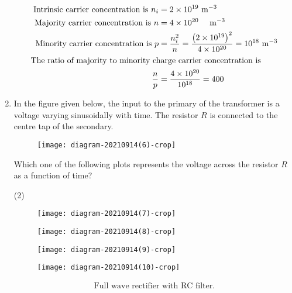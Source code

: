 \begin{enumerate}
	{	}
	\begin{answer}
		\begin{align*}
		\text{	Intrinsic carrier concentration is }n_{i}&=2 \times 10^{19} \mathrm{~m}^{-3}\\
		\text{Majority carrier concentration is }n&=4 \times 10^{20} \quad \mathrm{~m}^{-3}\\
		\text{Minority carrier concentration is }p&=\frac{n_{i}^{2}}{n}=\frac{\left(2 \times 10^{19}\right)^{2}}{4 \times 10^{20}}=10^{18} \mathrm{~m}^{-3}\\
		\intertext{The ratio of majority to minority charge carrier concentration is }\frac{n}{p}&=\frac{4 \times 10^{20}}{10^{18}}=400
		\end{align*}
	\end{answer}
	\item In the figure given below, the input to the primary of the transformer is a voltage varying sinusoidally with time. The resistor $R$ is connected to the centre tap of the secondary.\\
	\begin{figure}[H]
		\centering
		\texttt{[image: diagram-20210914(6)-crop]}
	\end{figure}
	Which one of the following plots represents the voltage across the resistor $R$ as a function of time?
	{}
	\begin{tasks}(2)
		\task[\textbf{A.}] \begin{figure}[H]
			\centering
			\texttt{[image: diagram-20210914(7)-crop]}
		\end{figure}
		\task[\textbf{B.}] \begin{figure}[H]
			\centering
			\texttt{[image: diagram-20210914(8)-crop]}
		\end{figure}
		\task[\textbf{C.}] \begin{figure}[H]
			\centering
			\texttt{[image: diagram-20210914(9)-crop]}
		\end{figure}
		\task[\textbf{D.}] 
		\begin{figure}[H]
			\centering
			\texttt{[image: diagram-20210914(10)-crop]}
		\end{figure}
	\end{tasks}
	\begin{answer}
		\begin{align*}
		\text{Full wave rectifier with RC filter.}
		\end{align*}

\end{answer}
\end{enumerate}
